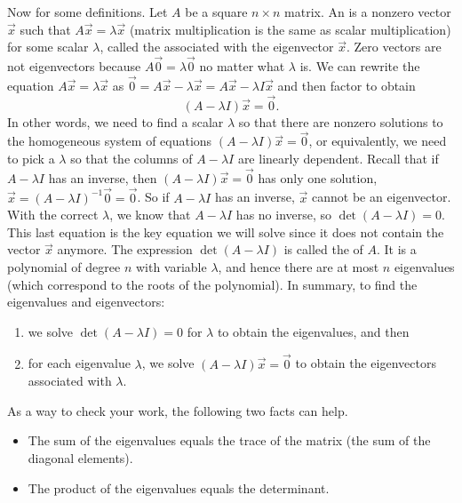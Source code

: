 Now for some definitions. 
Let $A$ be a square $n\times n$ matrix. 
An  is a nonzero vector $\vec x$ such that $A\vec x =\lambda \vec x$ (matrix multiplication is the same as scalar multiplication) for some scalar {$\lambda$}, called the  associated with the eigenvector $\vec x$.
Zero vectors are not eigenvectors because $A\vec 0=\lambda \vec 0$ no matter what $\lambda$ is.
We can rewrite the equation $A\vec x = \lambda \vec x$ as $\vec 0 = A\vec x-\lambda \vec x = A\vec x-\lambda I \vec x$ and then factor to obtain $$(A-\lambda I)\vec x=\vec 0.$$ 
In other words, we need to find a scalar $\lambda$ so that there are nonzero solutions to the homogeneous system of equations $(A-\lambda I)\vec x=\vec 0$, or equivalently, we need to pick a $\lambda$ so that the columns of $A-\lambda I$ are linearly dependent. 
Recall that if $A-\lambda I$ has an inverse, then $(A-\lambda I)\vec x=\vec 0$ has only one solution, $\vec x=(A-\lambda I)^{-1}\vec 0=\vec 0$.  So if $A-\lambda I$ has an inverse, $\vec x$ cannot be an eigenvector.  With the correct $\lambda$, we know that $A-\lambda I$ has no inverse, so $\det(A-\lambda I)=0$. 
This last equation is the key equation we will solve since it does not contain the vector $\vec x$ anymore. 
The expression {$\det(A-\lambda I)$} is called the  of {$A$}.
It is a polynomial of degree {$n$} with variable $\lambda$, and hence there are at most {$n$} eigenvalues (which correspond to the roots of the polynomial). 
In summary, to find the eigenvalues and eigenvectors:
\begin{enumerate}
	\item we solve $\det(A-\lambda I) = 0$ for $\lambda$ to obtain the eigenvalues, and then
	\item for each eigenvalue $\lambda$, we solve $(A-\lambda I)\vec x=\vec 0$ to obtain the eigenvectors associated with $\lambda$.
\end{enumerate}
As a way to check your work, the following two facts can help.
\begin{itemize}
	\item {}The sum of the eigenvalues equals the trace of the matrix (the sum of the diagonal elements).
	\item The product of the eigenvalues equals the determinant.
\end{itemize}

